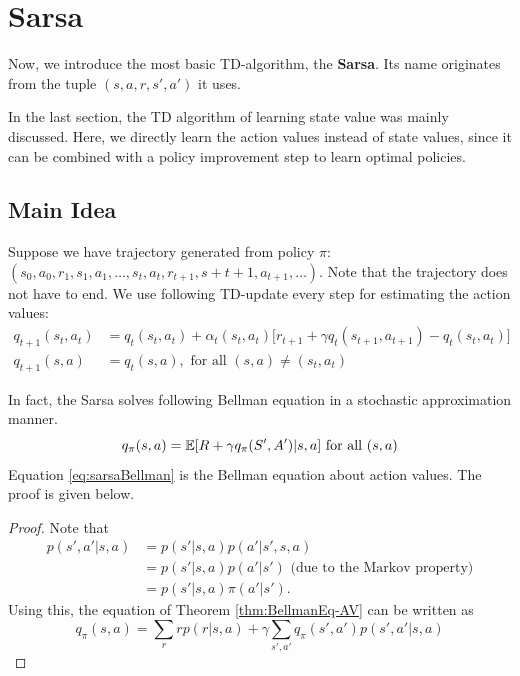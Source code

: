 \section{Sarsa}
    Now, we introduce the most basic TD-algorithm, the \textbf{Sarsa}. Its name originates from the
    tuple $(s,a,r,s',a')$ it uses.
    
    In the last section, the TD algorithm of learning state value was mainly discussed. Here, we directly learn the
    action values instead of state values, since it can be combined with a policy improvement step to learn optimal policies.
    \subsection{Main Idea}
        Suppose we have trajectory generated from policy $\pi$: $(s_0,a_0,r_1,s_1,a_1,\dots,s_t,a_t,r_{t+1},s+{t+1},a_{t+1},\dots).$
        Note that the trajectory does not have to end. We use following TD-update every step for estimating the action values:
        \begin{align}
            q_{t+1}(s_t,a_t) &= q_t(s_t,a_t) + \alpha_t(s_t,a_t)\Big[ r_{t+1} + \gamma q_t(s_{t+1},a_{t+1}) - q_t(s_t,a_t) \Big] \label{eq:SarsaUpdate}\\
            q_{t+1}(s,a) &= q_t(s,a),\text{ for all }(s,a) \neq (s_t,a_t)
        \end{align}    

        In fact, the Sarsa solves following Bellman equation in a stochastic approximation manner.
        \begin{equation}
            q_\pi(s,a) = \mathbb{E}[R + \gamma q_\pi(S',A')|s,a] \text{ for all }(s, a) \label{eq:sarsaBellman}
        \end{equation}
        Equation \ref{eq:sarsaBellman} is the Bellman equation about action values. The proof is given below.
        \begin{proof}
            Note that
            \begin{align}
                p(s',a'|s,a) &= p(s'|s,a)p(a'|s',s,a) \\
                             &= p(s'|s,a)p(a'|s') \text{ (due to the Markov property)} \\
                             &= p(s'|s,a)\pi(a'|s').
            \end{align}
            Using this, the equation of Theorem \ref{thm:BellmanEq-AV} can be written as
            \begin{equation}
                q_\pi(s,a) = \sum_{r}rp(r|s,a) + \gamma \sum_{s',a'}q_\pi(s',a')p(s',a'|s,a)
            \end{equation}
        \end{proof}
